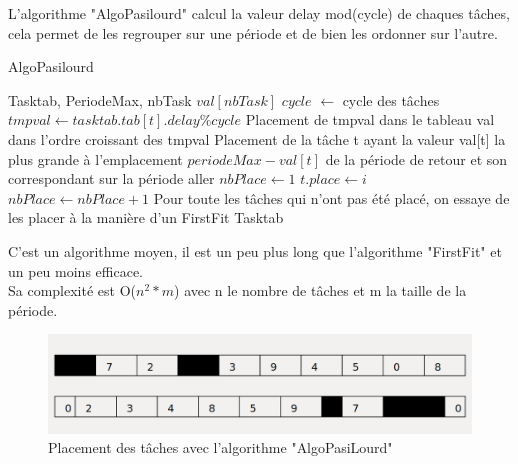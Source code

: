 \documentclass[11pt]{article}
\begin{document}
L'algorithme "AlgoPasilourd" calcul la valeur delay mod(cycle) de chaques tâches, cela permet de les regrouper sur une période et de bien les ordonner sur l'autre.

\begin{algorithm}[H]
    \caption{AlgoPasilourd}
    \begin{algorithmic}
    \REQUIRE Tasktab, PeriodeMax, nbTask
    \STATE $val[nbTask]$
    \STATE $cycle$ $\leftarrow$ cycle des tâches
        \STATE $tmpval \leftarrow tasktab.tab[t].delay\%cycle$
        \STATE Placement de tmpval dans le tableau val dans l'ordre croissant des tmpval
    \ENDFOR
    \STATE Placement de la tâche t ayant la valeur val[t] la plus grande à l'emplacement $periodeMax - val[t]$ de la période de retour et son correspondant sur la période aller
    \STATE $nbPlace \leftarrow 1$
                        \STATE $t.place \leftarrow i$
                    \ENDIF
                \ENDFOR
                \STATE $nbPlace \leftarrow nbPlace+1$
            \ENDIF
        \ENDFOR
    \ENDFOR
    \STATE Pour toute les tâches qui n'ont pas été placé, on essaye de les placer à la manière d'un FirstFit
    \RETURN Tasktab
    \end{algorithmic}
\end{algorithm}

C'est un algorithme moyen, il est un peu plus long que l'algorithme "FirstFit" et un peu moins efficace.\\
Sa complexité est O($n^2*m$) avec n le nombre de tâches et m la taille de la période.

\begin{figure}[H]
    \centering
    \includegraphics[scale = 0.35]{AlgoPasiLourd}
    \caption{Placement des tâches avec l'algorithme "AlgoPasiLourd"}
\end{figure}
\end{document}
